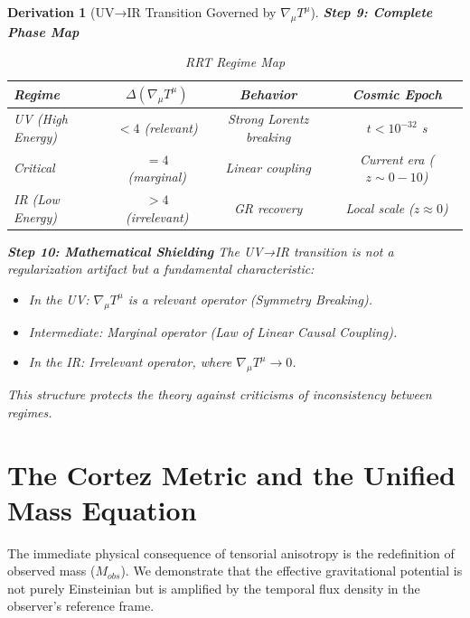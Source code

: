 \documentclass[10pt, a4paper]{article}
\newtheorem{derivation}{Derivation}
\begin{document}
\begin{derivation}[UV→IR Transition Governed by $\nabla_\mu T^\mu$]
\textbf{Step 9: Complete Phase Map}
\begin{table}[ht]
\centering
\caption{RRT Regime Map}
\begin{tabular}{lccc}
\toprule
\textbf{Regime} & \textbf{$\Delta(\nabla_\mu T^\mu)$} & \textbf{Behavior} & \textbf{Cosmic Epoch} \\
\midrule
UV (High Energy) & $< 4$ (relevant) & Strong Lorentz breaking & $t < 10^{-32}$ s \\
Critical & $= 4$ (marginal) & Linear coupling & Current era ($z \sim 0-10$) \\
IR (Low Energy) & $> 4$ (irrelevant) & GR recovery & Local scale ($z \approx 0$) \\
\bottomrule
\end{tabular}
\end{table}

\textbf{Step 10: Mathematical Shielding}
The UV→IR transition is not a regularization artifact but a fundamental characteristic:
\begin{itemize}
\item In the UV: $\nabla_\mu T^\mu$ is a relevant operator (Symmetry Breaking).
\item Intermediate: Marginal operator (Law of Linear Causal Coupling).
\item In the IR: Irrelevant operator, where $\nabla_\mu T^\mu \to 0$.
\end{itemize}
This structure protects the theory against criticisms of inconsistency between regimes.
\end{derivation}

\section{The Cortez Metric and the Unified Mass Equation}

The immediate physical consequence of tensorial anisotropy is the redefinition of observed mass ($M_{obs}$). We demonstrate that the effective gravitational potential is not purely Einsteinian but is amplified by the temporal flux density in the observer's reference frame.
\end{document}
